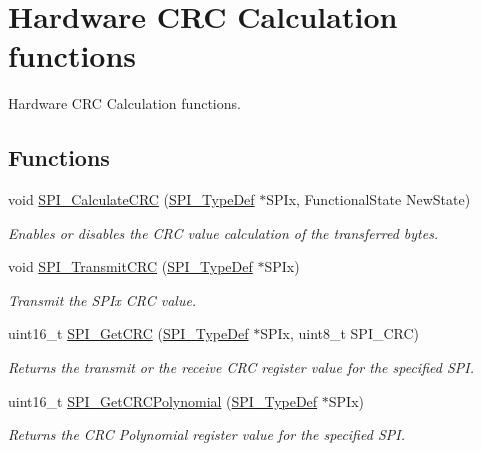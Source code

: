 \hypertarget{group___s_p_i___group3}{}\section{Hardware C\+R\+C Calculation functions}
\label{group___s_p_i___group3}


Hardware C\+R\+C Calculation functions.  


\subsection*{Functions}
\begin{DoxyCompactItemize}
\item 
void \hyperlink{group___s_p_i___group3_ga64f7276d119e6cb58afc100f8832adb0}{S\+P\+I\+\_\+\+Calculate\+C\+R\+C} (\hyperlink{struct_s_p_i___type_def}{S\+P\+I\+\_\+\+Type\+Def} $\ast$S\+P\+Ix, Functional\+State New\+State)
\begin{DoxyCompactList}\small\item\em Enables or disables the C\+R\+C value calculation of the transferred bytes. \end{DoxyCompactList}\item 
void \hyperlink{group___s_p_i___group3_gace8b1058e09bab150b0dbe5978810273}{S\+P\+I\+\_\+\+Transmit\+C\+R\+C} (\hyperlink{struct_s_p_i___type_def}{S\+P\+I\+\_\+\+Type\+Def} $\ast$S\+P\+Ix)
\begin{DoxyCompactList}\small\item\em Transmit the S\+P\+Ix C\+R\+C value. \end{DoxyCompactList}\item 
uint16\+\_\+t \hyperlink{group___s_p_i___group3_ga4c81c193516e82cf0a2fdc149ef20cc6}{S\+P\+I\+\_\+\+Get\+C\+R\+C} (\hyperlink{struct_s_p_i___type_def}{S\+P\+I\+\_\+\+Type\+Def} $\ast$S\+P\+Ix, uint8\+\_\+t S\+P\+I\+\_\+\+C\+R\+C)
\begin{DoxyCompactList}\small\item\em Returns the transmit or the receive C\+R\+C register value for the specified S\+P\+I. \end{DoxyCompactList}\item 
uint16\+\_\+t \hyperlink{group___s_p_i___group3_ga80fb9374cfce670f29128bb78568353f}{S\+P\+I\+\_\+\+Get\+C\+R\+C\+Polynomial} (\hyperlink{struct_s_p_i___type_def}{S\+P\+I\+\_\+\+Type\+Def} $\ast$S\+P\+Ix)
\begin{DoxyCompactList}\small\item\em Returns the C\+R\+C Polynomial register value for the specified S\+P\+I. \end{DoxyCompactList}\end{DoxyCompactItemize}



